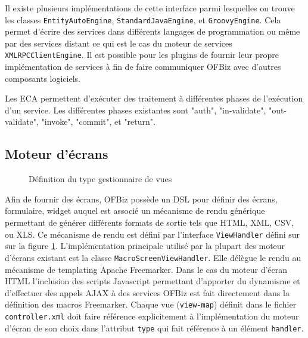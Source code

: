 \documentclass[a4paper, 11pt]{report}
\begin{document}
Il existe plusieurs implémentations de cette interface parmi
lesquelles on trouve les classes \texttt{EntityAutoEngine},
\texttt{StandardJavaEngine}, et \texttt{GroovyEngine}.  Cela permet
d'écrire des services dans différents langages de programmation ou
même par des services distant ce qui est le cas du moteur de services
\verb=XMLRPCClientEngine=. Il est possible pour les plugins de fournir
leur propre implémentation de services à fin de faire communiquer
OFBiz avec d'autres composants logiciels.

Les ECA permettent d'exécuter des traitement à différentes phases de
l'exécution d'un service.  Les différentes phases existantes sont
"auth", "in-validate", "out-validate", "invoke", "commit", et
"return".

\subsection{Moteur d'écrans}

\begin{figure}
  \centering
  \caption{Définition du type gestionnaire de vues}
  \label{fig:viewhandler}
\end{figure}

Afin de fournir des écrans, OFBiz possède un DSL pour définir des
écrans, formulaire, widget auquel est associé un mécanisme de rendu
générique permettant de générer différents formats de sortie tels que
HTML, XML, CSV, ou XLS.  Ce mécanisme de rendu est défini par
l'interface \verb=ViewHandler= défini sur sur la figure
\ref{fig:viewhandler}.  L'implémentation principale utilisé par la
plupart des moteur d'écrans existant est la classe
\verb=MacroScreenViewHandler=.  Elle délègue le rendu au mécanisme de
templating Apache Freemarker.  Dans le cas du moteur d'écran HTML
l'inclusion des scripts Javascript permettant d'apporter du dynamisme
et d'effectuer des appels AJAX \cite{garrett2005ajax} à des services
OFBiz est fait directement dans la définition des macros Freemarker.
Chaque vue (\verb=view-map=) définit dans le fichier
\verb=controller.xml= doit faire référence explicitement à
l'implémentation du moteur d'écran de son choix dans l'attribut
\verb=type= qui fait référence à un élément \verb=handler=.
\end{document}
